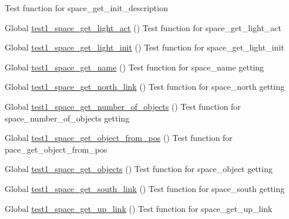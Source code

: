 \begin{DoxyRefList}
%
Test function for space\+\_\+get\+\_\+init\+\_\+description  
\item[Global \mbox{\hyperlink{space__test_8c_a74a049657a59821add89b12820519caa}{test1\+\_\+space\+\_\+get\+\_\+light\+\_\+act}} ()]\label{test__test000242}%
%
Test function for space\+\_\+get\+\_\+light\+\_\+act  
\item[Global \mbox{\hyperlink{space__test_8c_a1f22e809c6118492f8428d8a62751293}{test1\+\_\+space\+\_\+get\+\_\+light\+\_\+init}} ()]\label{test__test000238}%
%
Test function for space\+\_\+get\+\_\+light\+\_\+init  
\item[Global \mbox{\hyperlink{space__test_8c_ad12c42523c517507566c5c68b1527689}{test1\+\_\+space\+\_\+get\+\_\+name}} ()]\label{test__test000191}%
%
Test function for space\+\_\+name getting  
\item[Global \mbox{\hyperlink{space__test_8c_a7061fdbaa7fb6aa19978747b51d366d9}{test1\+\_\+space\+\_\+get\+\_\+north\+\_\+link}} ()]\label{test__test000193}%
%
Test function for space\+\_\+north getting  
\item[Global \mbox{\hyperlink{space__test_8c_a13b4b4cca257f5e84daed445fe1e4eff}{test1\+\_\+space\+\_\+get\+\_\+number\+\_\+of\+\_\+objects}} ()]\label{test__test000207}%
%
Test function for space\+\_\+number\+\_\+of\+\_\+objects getting  
\item[Global \mbox{\hyperlink{space__test_8c_aba032ab83c1e7c5d749d2cfe7c07d2c0}{test1\+\_\+space\+\_\+get\+\_\+object\+\_\+from\+\_\+pos}} ()]\label{test__test000230}%
%
Test function for pace\+\_\+get\+\_\+object\+\_\+from\+\_\+pos  
\item[Global \mbox{\hyperlink{space__test_8c_a30ccffb300d95f8db99bf7a5f1d57352}{test1\+\_\+space\+\_\+get\+\_\+objects}} ()]\label{test__test000201}%
%
Test function for space\+\_\+object getting  
\item[Global \mbox{\hyperlink{space__test_8c_aa3375a14f54e0970bd77d4d99b66b2eb}{test1\+\_\+space\+\_\+get\+\_\+south\+\_\+link}} ()]\label{test__test000195}%
%
Test function for space\+\_\+south getting  
\item[Global \mbox{\hyperlink{space__test_8c_aa1c49888bc8addb5eb641973b6f67095}{test1\+\_\+space\+\_\+get\+\_\+up\+\_\+link}} ()]\label{test__test000224}%
%
Test function for space\+\_\+get\+\_\+up\+\_\+link  

\end{DoxyRefList}
